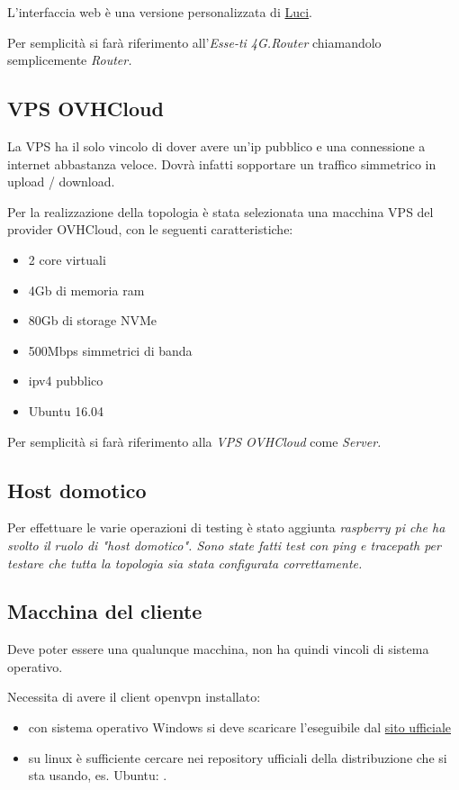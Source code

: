 \begin{figure}[H]
\end{figure}

L'interfaccia web è una versione personalizzata di \href{https://openwrt.org/docs/guide-user/luci/start}{Luci}.

Per semplicità si farà riferimento all'\textit{Esse-ti 4G.Router} chiamandolo semplicemente \it{Router}.

\subsection{VPS OVHCloud}

La VPS ha il solo vincolo di dover avere un'ip pubblico e una connessione a internet abbastanza veloce. Dovrà infatti sopportare un traffico simmetrico in upload / download.

Per la realizzazione della topologia è stata selezionata una macchina VPS del provider OVHCloud, con le seguenti caratteristiche:

\begin{itemize}
	\item 2 core virtuali
	\item 4Gb di memoria ram
	\item 80Gb di storage NVMe
	\item 500Mbps simmetrici di banda
	\item ipv4 pubblico
	\item Ubuntu 16.04
\end{itemize}

Per semplicità si farà riferimento alla \textit{VPS OVHCloud} come \it{Server}.

\subsection{Host domotico}

Per effettuare le varie operazioni di testing è stato aggiunta \it{raspberry pi} che ha svolto il ruolo di "host domotico". Sono state fatti test con ping e tracepath per testare che tutta la topologia sia stata configurata correttamente.


\subsection{Macchina del cliente}

Deve poter essere una qualunque macchina, non ha quindi vincoli di sistema operativo.

Necessita di avere il client openvpn installato:

\begin{itemize}
	\item con sistema operativo Windows si deve scaricare l'eseguibile dal \href{https://openvpn.net/client-connect-vpn-for-windows/}{sito ufficiale}
	\item su linux è sufficiente cercare nei repository ufficiali della distribuzione che si sta usando, es. Ubuntu: .
\end{itemize}


